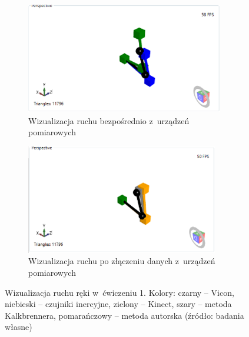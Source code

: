 	\begin{figure}[!htb]
		\captionsetup{singlelinecheck=off}
		\centering
		\begin{subfigure}[b]{0.48\textwidth}
			\centering
			\includegraphics[width=\textwidth]{images/100/raw.png}	
			\caption{Wizualizacja ruchu bezpośrednio z~urządzeń pomiarowych}
			\label{fig:experiments:first:raw}
		\end{subfigure}
							\hfill																														
		\begin{subfigure}[b]{0.48\textwidth}
			\centering
			\includegraphics[width=\textwidth]{images/100/Fused.png}		
			\caption{Wizualizacja ruchu po złączeniu danych z~urządzeń pomiarowych}
			\label{fig:experiments:first:fused}	
		\end{subfigure}
																																				
		\caption[Wizualizacja ruchu ręki w~ćwiczeniu 1]{Wizualizacja ruchu ręki w~ćwiczeniu 1.  Kolory: czarny -- Vicon, niebieski -- czujniki inercyjne, zielony -- Kinect, szary -- metoda Kalkbrennera, pomarańczowy -- metoda autorska (źródło: badania własne)}	
		\label{fig:experiments:first}
	\end{figure}
														
